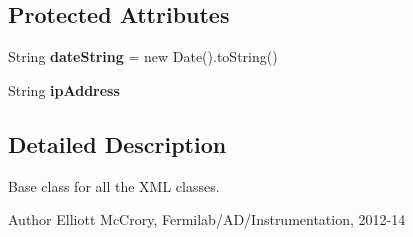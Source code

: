 \subsection*{Protected Attributes}
\begin{DoxyCompactItemize}
\item 
\hypertarget{classgov_1_1fnal_1_1ppd_1_1dd_1_1xml_1_1EncodedCarrier_a54239a994c69adb2dde01ebb6e1e69a9}{String {\bfseries date\-String} = new Date().to\-String()}\label{classgov_1_1fnal_1_1ppd_1_1dd_1_1xml_1_1EncodedCarrier_a54239a994c69adb2dde01ebb6e1e69a9}

\item 
\hypertarget{classgov_1_1fnal_1_1ppd_1_1dd_1_1xml_1_1EncodedCarrier_a28c58a66382080af31eed8d56a53b62a}{String {\bfseries ip\-Address}}\label{classgov_1_1fnal_1_1ppd_1_1dd_1_1xml_1_1EncodedCarrier_a28c58a66382080af31eed8d56a53b62a}

\end{DoxyCompactItemize}


\subsection{Detailed Description}
Base class for all the X\-M\-L classes.

\begin{DoxyAuthor}{Author}
Elliott Mc\-Crory, Fermilab/\-A\-D/\-Instrumentation, 2012-\/14 
\end{DoxyAuthor}


